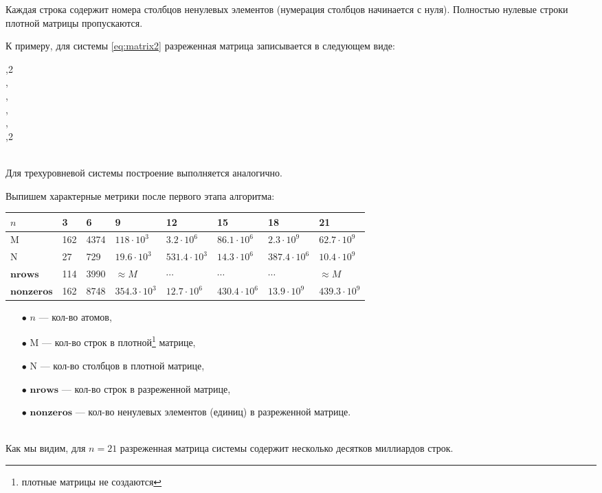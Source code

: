 Каждая строка содержит номера столбцов ненулевых элементов (нумерация столбцов
начинается с нуля). Полностью нулевые строки плотной матрицы пропускаются.

К примеру, для системы \eqref{eq:matrix2} разреженная матрица записывается в следующем виде:
\begin{flushleft}
	\noindent {},2\\
	\noindent{},\\
	\noindent{},\\
	\noindent{},\\
	\noindent{},\\
	\noindent{},2\\
\end{flushleft}\label{eq:sparse_matrix2}
\
\\[12pt]
\noindent Для трехуровневой системы построение выполняется аналогично.

\clearpage
\noindent Выпишем характерные метрики после первого этапа алгоритма:

\noindent
{\footnotesize
	\begin{tabular}[t]{|p{5em}|p{3em}|p{4em}|p{5em}|p{5em}|p{5em}|p{5em}|p{5em}|}
		\hline
		$n$ & 3 & 6 & 9 & 12 & 15 & 18 & 21 \\
		\hline
		$\mathrm{M}$ & 162 & 4374 & $118 \cdot 10^{3}$ & $3.2 \cdot 10^{6}$ & $86.1 \cdot 10^{6}$ & $2.3 \cdot 10^{9}$ & $62.7 \cdot 10^{9}$ \\
		\hline
		$\mathrm{N}$ & 27 & 729 & $19.6 \cdot 10^{3}$ & $531.4 \cdot 10^{3}$ & $14.3 \cdot 10^{6}$ & $387.4 \cdot 10^{6}$ & $10.4 \cdot 10^{9}$ \\
		\hline
		$\mathbf{nrows}$ & 114 & 3990 & $\approx M$ & $\cdots$ & $\cdots$ & $\cdots$ & $\approx M$ \\
		\hline
		$\mathbf{nonzeros}$ & 162 & 8748 & $354.3 \cdot 10^{3}$ & $12.7 \cdot 10^{6}$ & $430.4 \cdot 10^{6}$ & $13.9 \cdot 10^{9}$ & $439.3 \cdot 10^{9}$ \\
		\hline
	\end{tabular}
}

\begin{itemize}
	\item[$\bullet$]{$n$  --- кол-во атомов},
	\item[$\bullet$]{$\mathrm{M}$ --- кол-во строк в плотной\footnote[1]{плотные матрицы не создаются} матрице,}
	\item[$\bullet$]{$\mathrm{N}$ --- кол-во столбцов в плотной матрице,}
	\item[$\bullet$]{$\mathbf{nrows}$  --- кол-во строк в разреженной матрице,}
	\item[$\bullet$]{$\mathbf{nonzeros}$ --- кол-во ненулевых элементов (единиц) в разреженной матрице.}
\end{itemize}
\
\\[0pt]
\noindent Как мы видим, для $n = 21$ разреженная матрица системы содержит несколько десятков миллиардов строк.

